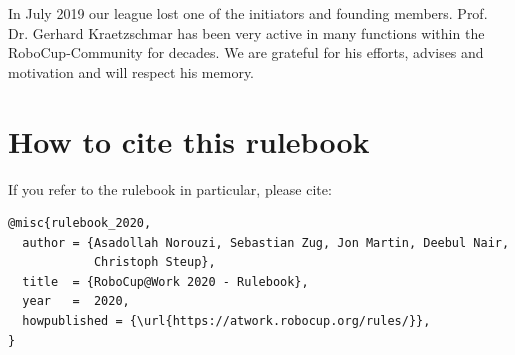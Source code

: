 \begin{titlepage}
In July 2019 our league lost one of the initiators and founding members. Prof. Dr. Gerhard
Kraetzschmar has been very active in many functions within the RoboCup-Community
for decades. We are grateful for his efforts, advises and motivation and will respect his memory.

\section*{How to cite this rulebook}

If you refer to the rulebook in particular, please cite:


\begin{verbatim}
@misc{rulebook_2020,
  author = {Asadollah Norouzi, Sebastian Zug, Jon Martin, Deebul Nair,
            Christoph Steup},
  title  = {RoboCup@Work 2020 - Rulebook},
  year   =  2020,
  howpublished = {\url{https://atwork.robocup.org/rules/}},
}
\end{verbatim}

\end{titlepage}
